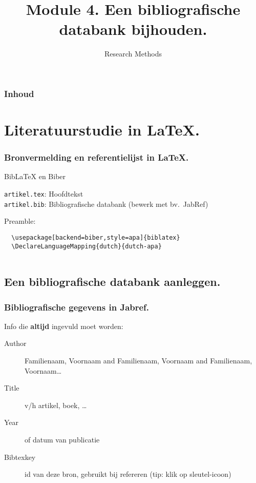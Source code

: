 \documentclass[aspectratio=169]{beamer}
\title{Module 4. Een bibliografische databank bijhouden.}
\subtitle{Research Methods}
\author{\lecturers}   %
\date{\academicyear}
\begin{document}
\begin{frame}
  \maketitle
\end{frame}

\begin{frame}
  \frametitle{Inhoud}

  \tableofcontents
\end{frame}

\section{Literatuurstudie in {\LaTeX}.}

\begin{frame}[fragile]
  \frametitle{Bronvermelding en referentielijst in {\LaTeX}.}

  Bib{\LaTeX} en Biber

  \vspace{18pt}

  \verb|artikel.tex|: Hoofdtekst\\
  \verb|artikel.bib|: Bibliografische databank (bewerk met bv.~JabRef)

  \vspace{18pt}

  Preamble:

  \begin{verbatim}
  \usepackage[backend=biber,style=apa]{biblatex}
  \DeclareLanguageMapping{dutch}{dutch-apa}
  
  \end{verbatim}

\end{frame}

\subsection{Een bibliografische databank aanleggen.}

\begin{frame}
  \frametitle{Bibliografische gegevens in Jabref.}

  Info die \textbf{altijd} ingevuld moet worden:

  \begin{description}
    \item[Author] Familienaam, Voornaam and Familienaam, Voornaam and Familienaam, Voornaam\ldots
    \item[Title] v/h artikel, boek, \ldots
    \item[Year] of datum van publicatie
    \item[Bibtexkey] id van deze bron, gebruikt bij refereren (tip: klik op sleutel-icoon)
  \end{description}
\end{frame}
\end{document}
